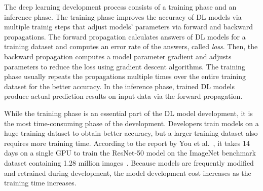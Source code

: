 The deep learning development process consists of a training phase and an
inference phase.
The training phase improves the accuracy of DL models via multiple trainig
steps that adjust models' parameters via forward and backward propagations. 
The forward propagation calculates answers of DL models for a training dataset
and computes an error rate of the answers, called {\it loss}.
Then, the backward propagation computes a model parameter gradient and adjusts
parameters to reduce the loss using gradient descent algorithms.
The training phase usually repeats the propagations multiple times over the
entire training dataset for the better accuracy.
In the inference phase, trained DL models produce actual prediction results on
input data via the forward propagation.

While the training phase is an essential part of the DL model development, it
is the most time-consuming phase of the development.
Developers train models on a huge training dataset to obtain better accuracy,
but a larger training dataset also requires more training time.
According to the report by You et al.~\cite{imagenettraining2017}, it takes 14
days on a single GPU to train the ResNet-50 model on the ImageNet benchmark
dataset containing 1.28 million images~\cite{imagenet2014}.
Because models are frequently modified and retrained during development, the
model development cost increases as the training time increases.

